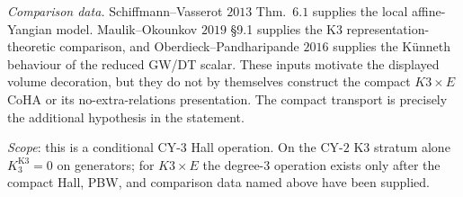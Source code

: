\begin{proposition}
\emph{Comparison data.} Schiffmann--Vasserot $2013$ Thm.\ $6.1$
supplies the local affine-Yangian model. Maulik--Okounkov $2019$
\S 9.1 supplies the K3 representation-theoretic comparison, and
Oberdieck--Pandharipande $2016$ supplies the K\"unneth behaviour of the
reduced GW/DT scalar. These inputs motivate the displayed volume
decoration, but they do not by themselves construct the compact
$K3\times E$ CoHA or its no-extra-relations presentation. The compact
transport is precisely the additional hypothesis in the statement.

\emph{Scope}: this is a conditional CY-$3$ Hall operation. On the CY-$2$
K3 stratum alone $K_3^{\mathrm{K3}} = 0$ on generators; for
$K3\times E$ the degree-$3$ operation exists only after the compact
Hall, PBW, and comparison data named above have been supplied.
\end{proposition}

